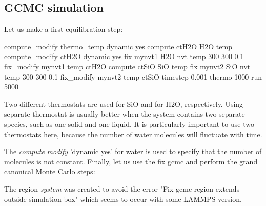 \noindent \subsection{GCMC simulation}

Let us make a first equilibration step:

\begin{lcverbatim}
compute_modify thermo_temp dynamic yes
compute ctH2O H2O temp
compute_modify ctH2O dynamic yes
fix mynvt1 H2O nvt temp 300 300 0.1
fix_modify mynvt1 temp ctH2O
compute ctSiO SiO temp
fix mynvt2 SiO nvt temp 300 300 0.1
fix_modify mynvt2 temp ctSiO
timestep 0.001
thermo 1000
run 5000
\end{lcverbatim}

\noindent \begin{tcolorbox}[colback=mylightblue!5!white,colframe=mylightblue!75!black,title=On thermostating groups instead of the entire system]
Two different thermostats are used for SiO and for H2O, respectively. Using 
separate thermostat is usually better when the system contains two separate species, such as one solid and one
liquid. It is particularly important to use two thermostats
here, because the number of water molecules will fluctuate with time.

\end{tcolorbox}

\noindent The \textit{compute$\_$modify} 'dynamic yes' for water is used to specify that the
number of molecules is not constant.
Finally, let us use the fix gcmc and perform the grand
canonical Monte Carlo steps:


\noindent \begin{tcolorbox}[colback=mylightblue!5!white,colframe=mylightblue!75!black,title=Dirty fix]
The region \textit{system} was created to avoid the error "Fix gcmc region extends outside simulation box"
which seems to occur with some LAMMPS version.
\end{tcolorbox}

